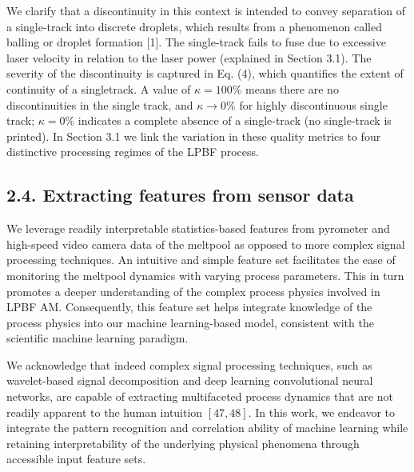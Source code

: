 \documentclass[10pt]{article}
\begin{document}
We clarify that a discontinuity in this context is intended to convey separation of a single-track into discrete droplets, which results from a phenomenon called balling or droplet formation [1]. The single-track fails to fuse due to excessive laser velocity in relation to the laser power (explained in Section 3.1). The severity of the discontinuity is captured in Eq. (4), which quantifies the extent of continuity of a singletrack. A value of $\kappa=100 \%$ means there are no discontinuities in the single track, and $\kappa \rightarrow 0 \%$ for highly discontinuous single track; $\kappa=0 \%$ indicates a complete absence of a single-track (no single-track is printed). In Section 3.1 we link the variation in these quality metrics to four distinctive processing regimes of the LPBF process.

\subsection*{2.4. Extracting features from sensor data}
We leverage readily interpretable statistics-based features from pyrometer and high-speed video camera data of the meltpool as opposed to more complex signal processing techniques. An intuitive and simple feature set facilitates the ease of monitoring the meltpool dynamics with varying process parameters. This in turn promotes a deeper understanding of the complex process physics involved in LPBF AM. Consequently, this feature set helps integrate knowledge of the process physics into our machine learning-based model, consistent with the scientific machine learning paradigm.

We acknowledge that indeed complex signal processing techniques, such as wavelet-based signal decomposition and deep learning convolutional neural networks, are capable of extracting multifaceted process dynamics that are not readily apparent to the human intuition $[47,48]$. In this work, we endeavor to integrate the pattern recognition and correlation ability of machine learning while retaining interpretability of the underlying physical phenomena through accessible input feature sets.
\end{document}
